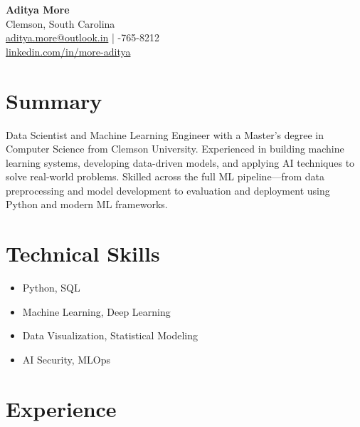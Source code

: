\documentclass[10pt]{article}
\begin{document}
\begin{center}
    {\LARGE \textbf{Aditya More}} \\
    Clemson, South Carolina \\
    \href{mailto:aditya.more@outlook.in}{aditya.more@outlook.in} \quad | -765-8212 \\
    \href{https://www.linkedin.com/in/more-aditya}{linkedin.com/in/more-aditya}
\end{center}

\vspace{0.2cm}

\section*{Summary}
Data Scientist and Machine Learning Engineer with a Master’s degree in Computer Science from Clemson University. Experienced in building machine learning systems, developing data-driven models, and applying AI techniques to solve real-world problems. Skilled across the full ML pipeline—from data preprocessing and model development to evaluation and deployment using Python and modern ML frameworks.

\vspace{0.2cm}

\section*{Technical Skills}
\begin{itemize}[noitemsep, topsep=0pt]
    \item Python, SQL
    \item Machine Learning, Deep Learning
    \item Data Visualization, Statistical Modeling
    \item AI Security, MLOps
\end{itemize}

\vspace{0.2cm}

\section*{Experience}
\end{document}
